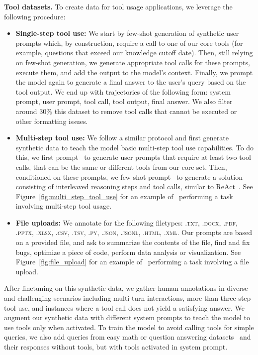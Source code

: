 \documentclass[dvipsnames]{fairmeta}
\begin{document}
\textbf{Tool datasets.}
To create data for tool usage applications, we leverage the following procedure:
\begin{itemize}
    \item \textbf{Single-step tool use:} We start by few-shot generation of synthetic user prompts which, by construction, require a call to one of our core tools (for example, questions that exceed our knowledge cutoff date).
    Then, still relying on few-shot generation, we generate appropriate tool calls for these prompts, execute them, and add the output to the model's context. Finally, we prompt the model again to generate a final answer to the user's query based on the tool output. We end up with trajectories of the following form: system prompt, user prompt, tool call, tool output, final answer. We also filter around $30\%$ this dataset to remove tool calls that cannot be executed or other formatting issues. 
    
    \item \textbf{Multi-step tool use:} We follow a similar protocol and first generate synthetic data to teach the model basic multi-step tool use capabilities. To do this, we first prompt \llamathree~to generate user prompts that require at least two tool calls, that can be the same or different tools from our core set. Then, conditioned on these prompts, we few-shot prompt \llamathree~to generate a solution consisting of interleaved reasoning steps and tool calls, similar to ReAct~\citep{yao2022react}. See Figure~\ref{fig:multi_step_tool_use} for an example of \llamathree~performing a task involving multi-step tool usage. 
    
    \item \textbf{File uploads:} We annotate for the following filetypes: \textsc{.txt, .docx, .pdf, .pptx, .xlsx, .csv, .tsv, .py, .json, .jsonl, .html, .xml}. Our prompts are based on a provided file, and ask to summarize the contents of the file, find and fix bugs, optimize a piece of code, perform data analysis or visualization. See Figure~\ref{fig:file_upload} for an example of \llamathree~performing a task involving a file upload. 
\end{itemize}

After finetuning on this synthetic data, we gather human annotations in diverse and challenging scenarios including multi-turn interactions, more than three step tool use, and instances where a tool call does not yield a satisfying answer.
We augment our synthetic data with different system prompts to teach the model to use tools only when activated. To train the model to avoid calling tools for simple queries, we also add queries from easy math or question answering datasets~\citep{berant-etal-2013-semantic,koncel2016mawps,joshi-etal-2017-triviaqa,amini2019mathqa} and their responses without tools, but with tools activated in system prompt. 
\end{document}
